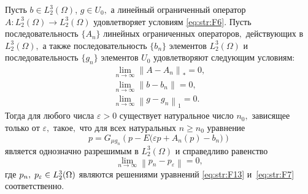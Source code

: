 \begin{theorem}[4]
Пусть $b\in L_{2}^{3} (\Omega)$, $g\in U_{0} ,$ а линейный ограниченный оператор $A\colon L_{2}^{3} (\Omega)\to L_{2}^{3} (\Omega)$ удовлетворяет условиям \eqref{eq:str:F6}$.$
Пусть последовательность $\{ A_n \}$ линейных ограниченных операторов$,$ действующих в $L_{2}^{3} (\Omega),$ а также последовательность $\{b_{n} \}$ элементов $L_{2}^{3} (\Omega)$ и последовательность $\{g_{n} \}$ элементов $U_{0} $ удовлетворяют следующим условиям\/{\rm:}
\begin{equation}
\label{eq:str:F12} 
\begin{array}{l}
 {\mathop{\lim }\limits_{n\to \infty } \left\| A-A_{n} \right\| _{*} =0,} \\ {\mathop{\lim }\limits_{n\to \infty } \left\| b-b_{n} \right\| =0,} \\  {\mathop{\lim }\limits_{n\to \infty } \left\| g-g_{n} \right\| _{1} =0.} 
 \end{array}
 \end{equation} 
Тогда для любого числа $\varepsilon >0$ существует натуральное число $n_{0} ,$ зависящее только от $\varepsilon ,$ такое$,$ что для всех натуральных $n\ge n_{0} $ уравнение
\begin{equation} 
\label{eq:str:F13} 
p=G_{\mu g_{n} } \left(p-E  \bigl(\varepsilon  p+A_{n} (p)-b_{n} \bigr)\right) \end{equation} 
является однозначно разрешимым в $L_{2}^{3} (\Omega)$ и справедливо равенство
$$
\mathop{\lim }\limits_{n\to \infty } \left\| p_{n} -p_{\varepsilon } \right\| =0,
$$ 
где $p_{n} ,{\rm \; }p_{\varepsilon } \in L_{2}^{3} (\Omega)$ являются решениями уравнений \eqref{eq:str:F13} и~\eqref{eq:str:F7} соответственно\rm .
\end{theorem}

\smallskip

